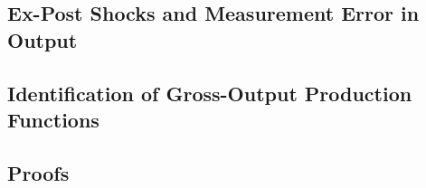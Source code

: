 \documentclass[11pt]{article}
\begin{document}
\subsection{Ex-Post Shocks and Measurement Error in Output}

\subsection{Identification of Gross-Output Production Functions}

\subsection{Proofs}
\end{document}
